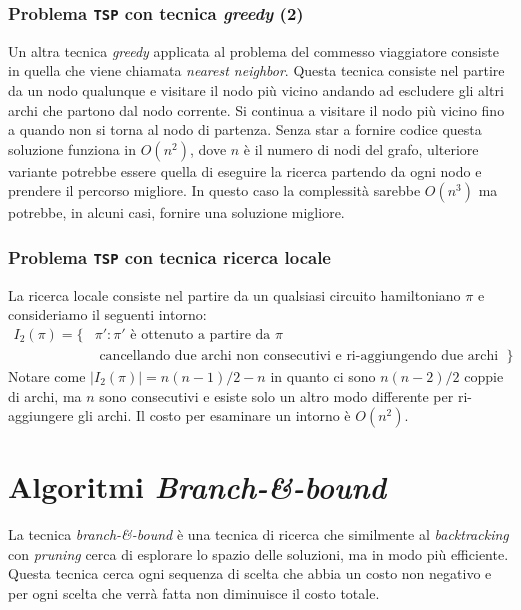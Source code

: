     \subsubsection{Problema \texttt{TSP} con tecnica \textit{greedy} (2)}
        Un altra tecnica \textit{greedy} applicata al problema del commesso viaggiatore consiste in quella che viene chiamata \textit{nearest neighbor}. Questa tecnica consiste nel partire da un nodo qualunque e visitare il nodo più vicino andando ad escludere gli altri archi che partono dal nodo corrente. Si continua a visitare il nodo più vicino fino a quando non si torna al nodo di partenza. \newline
        Senza star a fornire codice questa soluzione funziona in $O(n^2)$, dove $n$ è il numero di nodi del grafo, ulteriore variante potrebbe essere quella di eseguire la ricerca partendo da ogni nodo e prendere il percorso migliore. In questo caso la complessità sarebbe $O(n^3)$ ma potrebbe, in alcuni casi, fornire una soluzione migliore.
    \subsubsection{Problema \texttt{TSP} con tecnica ricerca locale}
        La ricerca locale consiste nel partire da un qualsiasi circuito hamiltoniano $\pi$ e consideriamo il seguenti intorno:
        \begin{align*}
            I_2(\pi)=\{& \pi':\pi' \text{ è ottenuto a partire da } \pi\\
            & \text{ cancellando due archi non consecutivi e ri-aggiungendo due archi non compresi nel circuito}\}
        \end{align*}
        Notare come $|I_2(\pi)|=n(n-1)/2-n$ in quanto ci sono $n(n-2)/2$ coppie di archi, ma $n$ sono consecutivi e esiste solo un altro modo differente per ri-aggiungere gli archi. \newline
        Il costo per esaminare un intorno è $O(n^2)$.

\section{Algoritmi \textit{Branch-\&-bound}}
    La tecnica \textit{branch-\&-bound} è una tecnica di ricerca che similmente al \textit{backtracking} con \textit{pruning} cerca di esplorare lo spazio delle soluzioni, ma in modo più efficiente. Questa tecnica cerca ogni sequenza di scelta che abbia un costo non negativo e per ogni scelta che verrà fatta non diminuisce il costo totale. 
